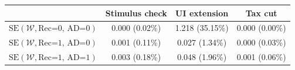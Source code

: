 \begin{tabular}{@{}lccc@{}}
\toprule
                          & Stimulus check      & UI extension    & Tax cut    \\  \midrule
$\mathrm{SE}(\mathcal{W}, \text{Rec=0, AD=0})$ & 0.000 (0.02\%)  & 1.218 (35.15\%)  & 0.000 (0.00\%)     \\
$\mathrm{SE}(\mathcal{W}, \text{Rec=1, AD=0})$ & 0.001 (0.11\%)  & 0.027 (1.34\%)  & 0.000 (0.03\%)     \\
$\mathrm{SE}(\mathcal{W}, \text{Rec=1, AD=1})$ & 0.003 (0.18\%)  & 0.048 (1.96\%)  & 0.001 (0.06\%)     \\ \bottomrule
\end{tabular}
